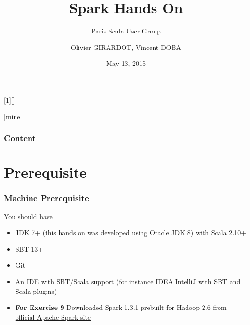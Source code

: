 \documentclass[slidetop,9pt,utf8]{beamer}
\begin{document}
\begin{CJK}{UTF8}{gbsn}

\AtBeginSection{\frame{\sectionpage}}

[1][]{%
}

[mine]

\title[Spark Hands On (PSUG)]{Spark Hands On}
\subtitle{Paris Scala User Group}
\author{Olivier GIRARDOT, Vincent DOBA}
\date{May 13, 2015}

\frame{\titlepage}

\begin{frame}[allowframebreaks]
  \frametitle{Content}
  \tableofcontents[hideallsubsections]
\end{frame}

\section{Prerequisite}

\begin{frame}
  \frametitle{Machine Prerequisite}

  \begin{block}{You should have}
    \begin{itemize}
      \item JDK 7+ (this hands on was developed using Oracle JDK 8) with Scala 2.10+
      \item SBT 13+
      \item Git
      \item An IDE with SBT/Scala support (for instance IDEA IntelliJ with SBT and Scala plugins)
      \item \textbf{For Exercise 9} Downloaded Spark 1.3.1 prebuilt for Hadoop 2.6 from \href{http://www.apache.org/dyn/closer.cgi/spark/spark-1.3.1/spark-1.3.1-bin-hadoop2.6.tgz}{official Apache Spark site}
    \end{itemize}
  \end{block}


\end{frame}
\end{CJK}
\end{document}
